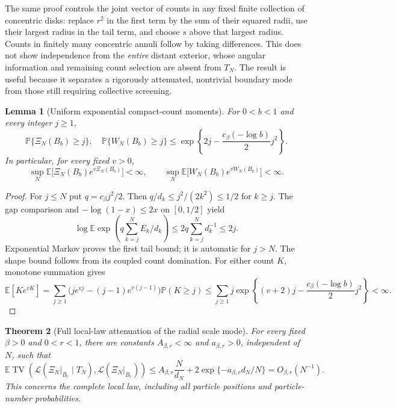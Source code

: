 \documentclass[11pt]{article}
\newcommand{\E}{\mathbb E}
\newcommand{\Pp}{\mathbb P}
\DeclareMathOperator{\TV}{TV}
\newtheorem{theorem}{Theorem}[section]
\newtheorem{lemma}[theorem]{Lemma}
\theoremstyle{remark}\newtheorem{remark}[theorem]{Remark}
\begin{document}
The same proof controls the joint vector of counts in any fixed finite
collection of concentric disks: replace $r^2$ in the first term by
the sum of their squared radii, use their largest radius in the tail
term, and choose $s$ above that largest radius. Counts in finitely many
concentric annuli follow by taking differences. This does not show
independence from the \emph{entire} distant exterior, whose angular
information and remaining count selection are absent from $T_N$.
The result is useful because it separates a rigorously attenuated,
nontrivial boundary mode from those still requiring collective screening.

\begin{lemma}[Uniform exponential compact-count moments]
\label{lem:radial-exponential-count}
For $0<b<1$ and every integer $j\ge1$,
\begin{equation}\label{eq:radial-Gaussian-count-tail}
 \Pp\{\Xi_N(B_b)\ge j\},\quad
 \Pp\{W_N(B_b)\ge j\}
 \le\exp\left\{2j-
           \frac{c_\beta(-\log b)}2j^2\right\}.
\end{equation}
In particular, for every fixed $v>0$,
\[
 \sup_N\E\bigl[\Xi_N(B_b)e^{v\Xi_N(B_b)}\bigr]<\infty,
 \qquad
 \sup_N\E\bigl[W_N(B_b)e^{vW_N(B_b)}\bigr]<\infty.
\]
\end{lemma}

\begin{proof}
For $j\le N$ put $q=c_\beta j^2/2$. Then
$q/d_k\le j^2/(2k^2)\le1/2$ for $k\ge j$. The gap comparison and
$-\log(1-x)\le2x$ on $[0,1/2]$ yield
\[
 \log\E\exp\left(q\sum_{k=j}^N E_k/d_k\right)
 \le2q\sum_{k=j}^N d_k^{-1}\le2j.
\]
Exponential Markov proves the first tail bound; it is automatic for
$j>N$. The shape bound follows from its coupled count domination.
For either count $K$, monotone summation gives
\[
 \E[K e^{vK}]
 =\sum_{j\ge1}\bigl(je^{vj}-(j-1)e^{v(j-1)}\bigr)\Pp(K\ge j)
 \le\sum_{j\ge1}j\exp\left\{(v+2)j-
               \frac{c_\beta(-\log b)}2j^2\right\}<\infty.
\]
\end{proof}

\begin{theorem}[Full local-law attenuation of the radial scale mode]
\label{thm:radial-full-law-screening}
For every fixed $\beta>0$ and $0<r<1$, there are constants
$A_{\beta,r}<\infty$ and $a_{\beta,r}>0$, independent of $N$, such that
\begin{equation}\label{eq:radial-full-law-TV}
 \E\TV\left(
    \mathcal L(\Xi_N|_{B_r}\mid T_N),
    \mathcal L(\Xi_N|_{B_r})\right)
 \le A_{\beta,r}\frac{N}{d_N}
             +2\exp\{-a_{\beta,r}d_N/N\}
 =O_{\beta,r}(N^{-1}).
\end{equation}
This concerns the complete local law, including all particle positions
and particle-number probabilities.
\end{theorem}
\end{document}
